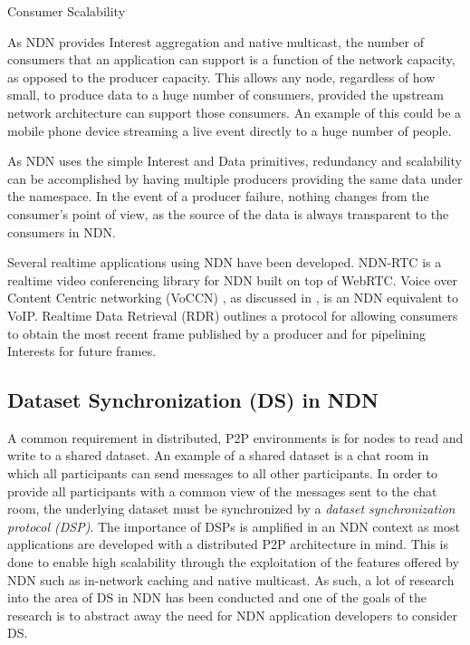 \begin{labeling}{Consumer Scalability }
    \item [Consumer Scalability] As NDN provides Interest aggregation and native multicast, the number of consumers that an application can support is a function of the network capacity, as opposed to the producer capacity. This allows any node, regardless of how small, to produce data to a huge number of consumers, provided the upstream network architecture can support those consumers. An example of this could be a mobile phone device streaming a live event directly to a huge number of people.
    \item [Producer Scalability] As NDN uses the simple Interest and Data primitives, redundancy and scalability can be accomplished by having multiple producers providing the same data under the namespace. In the event of a producer failure, nothing changes from the consumer's point of view, as the source of the data is always transparent to the consumers in NDN.
\end{labeling}

Several realtime applications using NDN have been developed. NDN-RTC \cite{ndn-rtc} is a realtime video conferencing library for NDN built on top of WebRTC. Voice over Content Centric networking (VoCCN) \cite{vj-voccn}, as discussed in , is an NDN equivalent to VoIP. Realtime Data Retrieval (RDR) \cite{realtime-data-retrieval} outlines a protocol for allowing consumers to obtain the most recent frame published by a producer and for pipelining Interests for future frames.


\subsection{Dataset Synchronization (DS) in NDN}\label{sec:dataset-sync}
A common requirement in distributed, P2P environments is for nodes to read and write to a shared dataset. An example of a shared dataset is a chat room in which all participants can send messages to all other participants. In order to provide all participants with a common view of the messages sent to the chat room, the underlying dataset must be synchronized by a  \textit{dataset synchronization protocol (DSP)}. The importance of DSPs is amplified in an NDN context as most applications are developed with a distributed P2P architecture in mind. This is done to enable high scalability through the exploitation of the features offered by NDN such as in-network caching and native multicast. As such, a lot of research into the area of DS in NDN has been conducted and one of the goals of the research is to abstract away the need for NDN application developers to consider DS.

